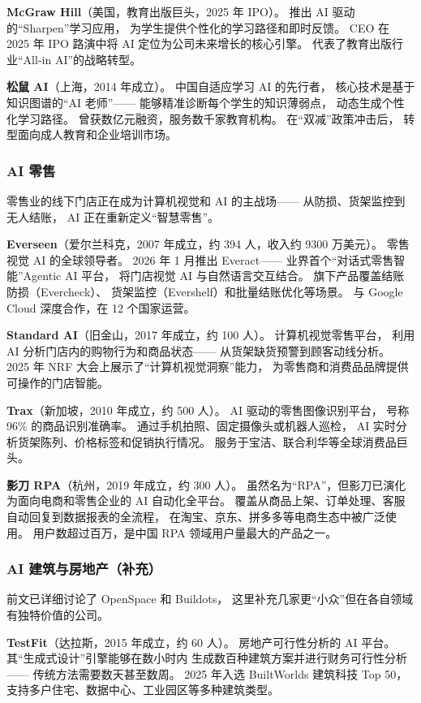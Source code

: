 \textbf{McGraw Hill}（美国，教育出版巨头，2025 年 IPO）。
推出 AI 驱动的``Sharpen''学习应用，
为学生提供个性化的学习路径和即时反馈。
CEO 在 2025 年 IPO 路演中将 AI 定位为公司未来增长的核心引擎。
代表了教育出版行业``All-in AI''的战略转型。

\textbf{松鼠 AI}（上海，2014 年成立）。
中国自适应学习 AI 的先行者，
核心技术是基于知识图谱的``AI 老师''——
能够精准诊断每个学生的知识薄弱点，
动态生成个性化学习路径。
曾获数亿元融资，服务数千家教育机构。
在``双减''政策冲击后，
转型面向成人教育和企业培训市场。

\subsubsection{AI 零售}

零售业的线下门店正在成为计算机视觉和 AI 的主战场——
从防损、货架监控到无人结账，
AI 正在重新定义``智慧零售''。

\textbf{Everseen}（爱尔兰科克，2007 年成立，约 394 人，收入约 9300 万美元）。
零售视觉 AI 的全球领导者。
2026 年 1 月推出 Everact——
业界首个``对话式零售智能''Agentic AI 平台，
将门店视觉 AI 与自然语言交互结合。
旗下产品覆盖结账防损（Evercheck）、
货架监控（Evershelf）和批量结账优化等场景。
与 Google Cloud 深度合作，在 12 个国家运营。

\textbf{Standard AI}（旧金山，2017 年成立，约 100 人）。
计算机视觉零售平台，
利用 AI 分析门店内的购物行为和商品状态——
从货架缺货预警到顾客动线分析。
2025 年 NRF 大会上展示了``计算机视觉洞察''能力，
为零售商和消费品品牌提供可操作的门店智能。

\textbf{Trax}（新加坡，2010 年成立，约 500 人）。
AI 驱动的零售图像识别平台，
号称 96\% 的商品识别准确率。
通过手机拍照、固定摄像头或机器人巡检，
AI 实时分析货架陈列、价格标签和促销执行情况。
服务于宝洁、联合利华等全球消费品巨头。

\textbf{影刀 RPA}（杭州，2019 年成立，约 300 人）。
虽然名为``RPA''，但影刀已演化为面向电商和零售企业的
AI 自动化全平台。
覆盖从商品上架、订单处理、客服自动回复到数据报表的全流程，
在淘宝、京东、拼多多等电商生态中被广泛使用。
用户数超过百万，是中国 RPA 领域用户量最大的产品之一。

\subsubsection{AI 建筑与房地产（补充）}

前文已详细讨论了 OpenSpace 和 Buildots，
这里补充几家更``小众''但在各自领域有独特价值的公司。

\textbf{TestFit}（达拉斯，2015 年成立，约 60 人）。
房地产可行性分析的 AI 平台。
其``生成式设计''引擎能够在数小时内
生成数百种建筑方案并进行财务可行性分析——
传统方法需要数天甚至数周。
2025 年入选 BuiltWorlds 建筑科技 Top 50，
支持多户住宅、数据中心、工业园区等多种建筑类型。

